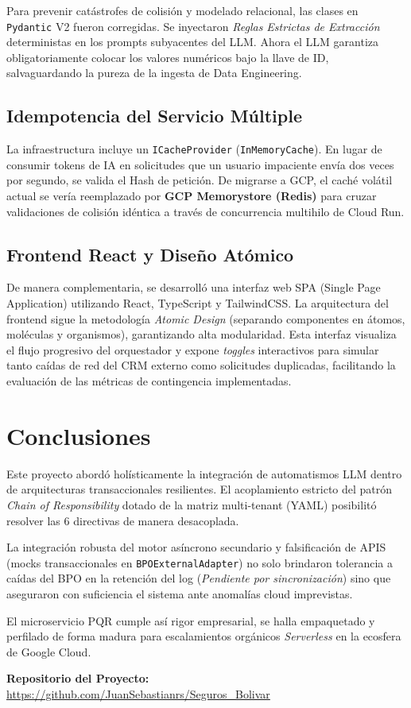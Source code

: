 \documentclass[twocolumn]{article}
\numberwithin{definition}{subsection}
\begin{document}
Para prevenir catástrofes de colisión y modelado relacional, las clases en \texttt{Pydantic} V2 fueron corregidas. Se inyectaron \textit{Reglas Estrictas de Extracción} deterministas en los prompts subyacentes del LLM. Ahora el LLM garantiza obligatoriamente colocar los valores numéricos bajo la llave de ID, salvaguardando la pureza de la ingesta de Data Engineering.

\subsection{Idempotencia del Servicio Múltiple}

La infraestructura incluye un \texttt{ICacheProvider} (\texttt{InMemoryCache}). En lugar de consumir tokens de IA en solicitudes que un usuario impaciente envía dos veces por segundo, se valida el Hash de petición. De migrarse a GCP, el caché volátil actual se vería reemplazado por \textbf{GCP Memorystore (Redis)} para cruzar validaciones de colisión idéntica a través de concurrencia multihilo de Cloud Run.

\subsection{Frontend React y Diseño Atómico}

De manera complementaria, se desarrolló una interfaz web SPA (Single Page Application) utilizando React, TypeScript y TailwindCSS. La arquitectura del frontend sigue la metodología \textit{Atomic Design} (separando componentes en átomos, moléculas y organismos), garantizando alta modularidad. Esta interfaz visualiza el flujo progresivo del orquestador y expone \textit{toggles} interactivos para simular tanto caídas de red del CRM externo como solicitudes duplicadas, facilitando la evaluación de las métricas de contingencia implementadas.

\section{Conclusiones}

Este proyecto abordó holísticamente la integración de automatismos LLM dentro de arquitecturas transaccionales resilientes. El acoplamiento estricto del patrón \textit{Chain of Responsibility} dotado de la matriz multi-tenant (YAML) posibilitó resolver las 6 directivas de manera desacoplada.  

La integración robusta del motor asíncrono secundario y falsificación de APIS (mocks transaccionales en \texttt{BPOExternalAdapter}) no solo brindaron tolerancia a caídas del BPO en la retención del log (\textit{Pendiente por sincronización}) sino que aseguraron con suficiencia el sistema ante anomalías cloud imprevistas. 

El microservicio PQR cumple así rigor empresarial, se halla empaquetado y perfilado de forma madura para escalamientos orgánicos \textit{Serverless} en la ecosfera de Google Cloud.

\vspace{0.5cm}
\textbf{Repositorio del Proyecto:} \url{https://github.com/JuanSebastianrs/Seguros_Bolivar}
\end{document}
